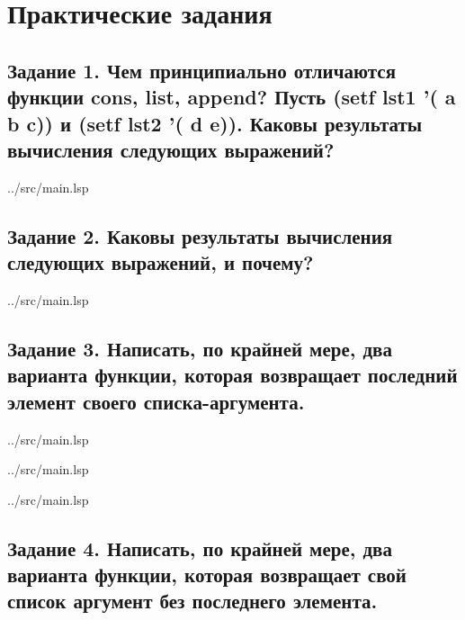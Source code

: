 \chapter{Практические задания}

\section*{Задание 1. Чем принципиально отличаются функции cons, list, append? Пусть (setf lst1 '( a b c))  и (setf lst2 '( d e)). Каковы результаты вычисления следующих выражений?}

\begin{lstinputlisting}[
	caption={Задание 1},
	label={lst:t1},
	style={lsp},
	linerange={1-6},
	]{../src/main.lsp}
\end{lstinputlisting}

\section*{Задание 2. Каковы   результаты   вычисления   следующих   выражений,   и   почему?}

\begin{lstinputlisting}[
	caption={Задание 2},
	label={lst:t2},
	style={lsp},
	linerange={8-17},
	]{../src/main.lsp}
\end{lstinputlisting}

\section*{Задание 3.  Написать, по крайней мере, два варианта функции, которая возвращает последний элемент своего списка-аргумента.}

\begin{lstinputlisting}[
	caption={Задание 3, вариант 1},
	label={lst:t3-1},
	style={lsp},
	linerange={27-39},
	]{../src/main.lsp}
\end{lstinputlisting}

\begin{lstinputlisting}[
	caption={Задание 3, вариант 2},
	label={lst:t3-2},
	style={lsp},
	linerange={23-25},
	]{../src/main.lsp}
\end{lstinputlisting}

\begin{lstinputlisting}[
	caption={Задание 3, вариант 3},
	label={lst:t3-3},
	style={lsp},
	linerange={19-21},
	]{../src/main.lsp}
\end{lstinputlisting}


\section*{Задание 4. Написать, по крайней мере, два варианта функции, которая возвращает свой список аргумент без последнего элемента. }

